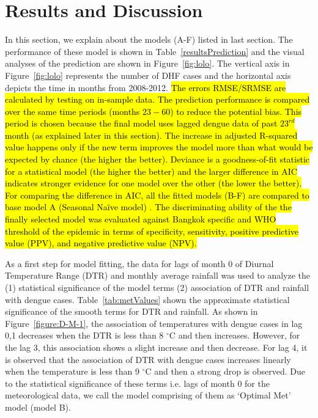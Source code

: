\documentclass{bmcart}
\begin{document}
\section{Results and Discussion} \label{results}


In this section, we explain about the models (A-F) listed in last section. The performance of these model is shown in Table~\ref{resultsPrediction} and the visual analyses of the prediction are shown in Figure~\ref{fig:lolo}. The vertical axis in Figure~\ref{fig:lolo} represents the number of DHF cases and the horizontal axis depicts the time in months from 2008-2012. \hl{The errors RMSE/SRMSE are calculated by testing on in-sample data. The prediction performance is compared over the same time periods (months $23-60$) to reduce the potential bias. This period is chosen because the final model uses lagged dengue data of past  $23^{rd}$ month (as explained later in this section). The increase in adjusted R-squared value happens only if the new term improves the model more than what would be expected by chance (the higher the better). Deviance is a goodness-of-fit statistic for a statistical model (the higher the better) and the larger difference in AIC indicates stronger evidence for one model over the other (the lower the better). For comparing  the difference in AIC, all the fitted models (B-F) are compared to base model A (Seasonal Na\"{i}ve model) .  The discriminating ability of the the finally selected model was evaluated against Bangkok specific and WHO threshold of the epidemic in terms of specificity, sensitivity, positive predictive value (PPV), and negative predictive value (NPV).}



As a first step for model fitting, the data for lags of month 0 of Diurnal Temperature Range (DTR) and monthly average rainfall was used to analyze the (1) statistical significance of the model terms (2) association of DTR and rainfall with dengue cases. Table~\ref{tab:metValues} shown the approximate statistical significance of the smooth terms for DTR and rainfall. As shown in Figure~\ref{figure:D-M-1}, the association of temperatures with dengue cases in lag 0,1 decreases when the DTR is less than 8 $^{\circ}$C and then increases. However, for the lag 3, this association shows a slight increase and then decrease. For lag 4, it is observed that the association of DTR with dengue cases increases linearly when the temperature is less than 9 $^{\circ}$C  and then a strong drop is observed. Due to the statistical significance of these terms i.e. lags of month 0 for the meteorological data, we call the model comprising of them as `Optimal Met' model (model B). 
\end{document}
